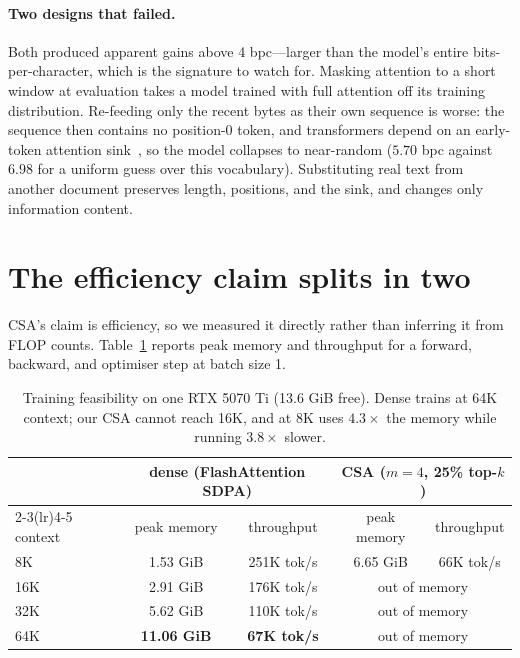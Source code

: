 \documentclass[11pt]{article}
\begin{document}
\paragraph{Two designs that failed.} Both produced apparent gains above
4 bpc---larger than the model's entire bits-per-character, which is the
signature to watch for. Masking attention to a short window at evaluation takes
a model trained with full attention off its training distribution. Re-feeding
only the recent bytes as their own sequence is worse: the sequence then
contains no position-0 token, and transformers depend on an early-token
attention sink~\cite{xiao2024streamingllm}, so the model collapses to near-random
($5.70$ bpc against $6.98$ for a uniform guess over this vocabulary).
Substituting real text from another document preserves length, positions, and
the sink, and changes only information content.

\section{The efficiency claim splits in two}
\label{sec:efficiency}

CSA's claim is efficiency, so we measured it directly rather than inferring it
from FLOP counts. Table~\ref{tab:feasibility} reports peak memory and
throughput for a forward, backward, and optimiser step at batch size 1.

\begin{table}[t]
\centering
\small
\begin{tabular}{lcccc}
\toprule
& \multicolumn{2}{c}{dense (FlashAttention SDPA)} & \multicolumn{2}{c}{CSA ($m=4$, 25\% top-$k$)} \\
\cmidrule(lr){2-3}\cmidrule(lr){4-5}
context & peak memory & throughput & peak memory & throughput \\
\midrule
8K  & 1.53 GiB  & 251K tok/s & 6.65 GiB & 66K tok/s \\
16K & 2.91 GiB  & 176K tok/s & \multicolumn{2}{c}{out of memory} \\
32K & 5.62 GiB  & 110K tok/s & \multicolumn{2}{c}{out of memory} \\
64K & \textbf{11.06 GiB} & \textbf{67K tok/s} & \multicolumn{2}{c}{out of memory} \\
\bottomrule
\end{tabular}
\caption{Training feasibility on one RTX 5070 Ti (13.6 GiB free). Dense trains
at 64K context; our CSA cannot reach 16K, and at 8K uses $4.3\times$ the memory
while running $3.8\times$ slower.}
\label{tab:feasibility}
\end{table}
\end{document}
